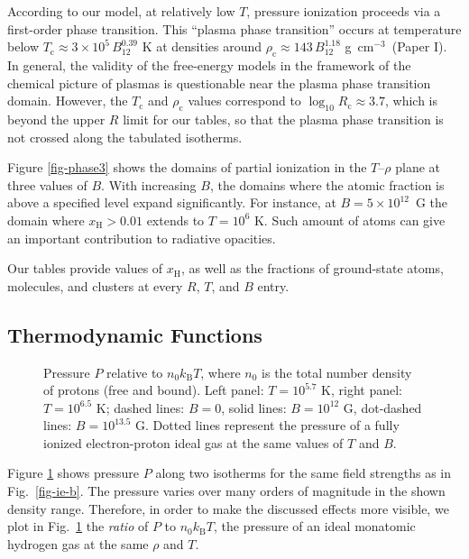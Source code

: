 \documentclass{emulateapj}
\newcommand{\gcc}{\mbox{g cm$^{-3}$}}
\newcommand{\kB}{k_\mathrm{B}}
\begin{document}
According to our model, at relatively low $T$, pressure ionization proceeds
via a first-order phase transition.
This ``plasma phase transition'' occurs
at temperature below  
$T_\mathrm{c}\approx 3\times10^5\,B_{12}^{0.39}$ K at densities
around $\rho_\mathrm{c}\approx 143\,B_{12}^{1.18}$ \gcc\ (Paper I).
In general, the validity of the free-energy models
in the framework of the chemical picture of plasmas 
is questionable near the plasma phase transition domain.
However, the $T_\mathrm{c}$ and $\rho_\mathrm{c}$ values correspond to
$\log_{10} R_\mathrm{c}\approx 3.7$, which is beyond the upper $R$
limit for our tables,
so that the plasma phase transition
is not crossed along the tabulated isotherms.

Figure \ref{fig-phase3} shows the domains of partial ionization
in the $T$--$\rho$ plane
at three values of $B$. With increasing $B$, the domains
where the atomic fraction is above a specified level
expand significantly. For instance, at $B=5\times10^{12}$~G
the domain where $x_\mathrm{H} > 0.01$
extends to $T=10^6$ K. Such amount of atoms
 can give an important contribution to radiative opacities.

Our tables provide values of $x_\mathrm{H}$, as well as 
the fractions of ground-state atoms, molecules, and clusters
at every $R$, $T$, and $B$ entry.

       \subsection{Thermodynamic Functions}
%
\begin{figure}
\caption{Pressure $P$ relative to $n_0 \kB T$,
where $n_0$ is the total
number density of protons (free and bound). 
Left panel: $T=10^{5.7}$ K,
right panel: $T=10^{6.5}$ K;
dashed lines: $B=0$, solid lines: $B=10^{12}$ G,
dot-dashed lines: $B=10^{13.5}$ G.
Dotted lines represent the pressure of a fully ionized 
electron-proton ideal gas at the same values of $T$ and $B$.
\label{fig-eos-blin}}
\end{figure}

Figure \ref{fig-eos-blin} shows pressure $P$ along two isotherms
for the same field strengths as in Fig.\ \ref{fig-ie-b}.
The pressure varies over many orders of magnitude in the
shown density range.
Therefore, in order to make 
the discussed effects more visible,
 we plot in Fig.\ \ref{fig-eos-blin}
the \emph{ratio} of $P$ to $n_0\kB T$,
the pressure of an ideal monatomic 
hydrogen gas at the same $\rho$ and $T$.
\end{document}
